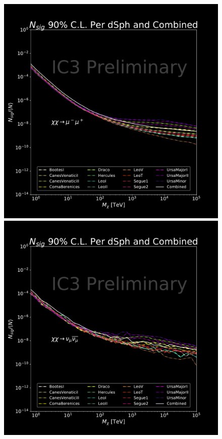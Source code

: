 \begin{figure}[h]
{        \includegraphics[scale=0.265]{figures/ic_DM/dm_plots/mumu_money_plot_comb_ns.pdf}
        \includegraphics[scale=0.265]{figures/ic_DM/dm_plots/numunumu_money_plot_comb_ns.pdf}
}
\end{figure}

